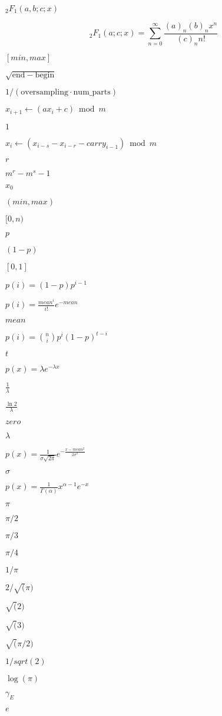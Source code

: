 \documentclass{article}
\begin{document}
$ {}_2F_1(a,b;c;x) $
\pagebreak

\[
   {}_2F_1(a;c;x) = \sum_{n=0}^{\infty} \frac{(a)_n (b)_n x^n}{(c)_n n!}
\]
\pagebreak

$[min, max]$
\pagebreak

$\sqrt{\mathrm{end} - \mathrm{begin}}$
\pagebreak

$1/(\mathrm{oversampling} \cdot \mathrm{num\_parts})$
\pagebreak

$x_{i+1}\leftarrow(ax_{i} + c) \bmod m $
\pagebreak

$ 1 $
\pagebreak

$x_{i}\leftarrow(x_{i - s} - x_{i - r} -
carry_{i-1}) \bmod m $
\pagebreak

$ r $
\pagebreak

$ m^r - m^s -1 $
\pagebreak

$ x_0 $
\pagebreak

$(min, max)$
\pagebreak

$[0, n)$
\pagebreak

$ p $
\pagebreak

$ (1 - p) $
\pagebreak

$ [0, 1] $
\pagebreak

$ p(i) = (1 - p)p^{i-1} $
\pagebreak

$ p(i) = \frac{mean^i}{i!} e^{-mean} $
\pagebreak

$ mean $
\pagebreak

$ p(i) = \binom{n}{i} p^i (1 - p)^{t - i} $
\pagebreak

$ t $
\pagebreak

$ p(x) = \lambda e^{-\lambda x} $
\pagebreak

$ \frac{1}{\lambda} $
\pagebreak

$ \frac{\ln 2}{\lambda} $
\pagebreak

$ zero $
\pagebreak

$ \lambda $
\pagebreak

$ p(x) = \frac{1}{\sigma \sqrt{2 \pi}} 
           e^{- \frac{{x - mean}^ {2}}{2 \sigma ^ {2}} } $
\pagebreak

$ \sigma $
\pagebreak

$ p(x) = \frac{1}{\Gamma(\alpha)} x^{\alpha - 1} e^{-x} $
\pagebreak

$ \pi $
\pagebreak

$ \pi / 2 $
\pagebreak

$ \pi / 3 $
\pagebreak

$ \pi / 4 $
\pagebreak

$ 1 / \pi $
\pagebreak

$ 2 / \sqrt(\pi) $
\pagebreak

$ \sqrt(2) $
\pagebreak

$ \sqrt(3) $
\pagebreak

$ \sqrt(\pi/2) $
\pagebreak

$ 1 / sqrt(2) $
\pagebreak

$ \log(\pi) $
\pagebreak

$ \gamma_E $
\pagebreak

$ e $
\pagebreak
\end{document}
